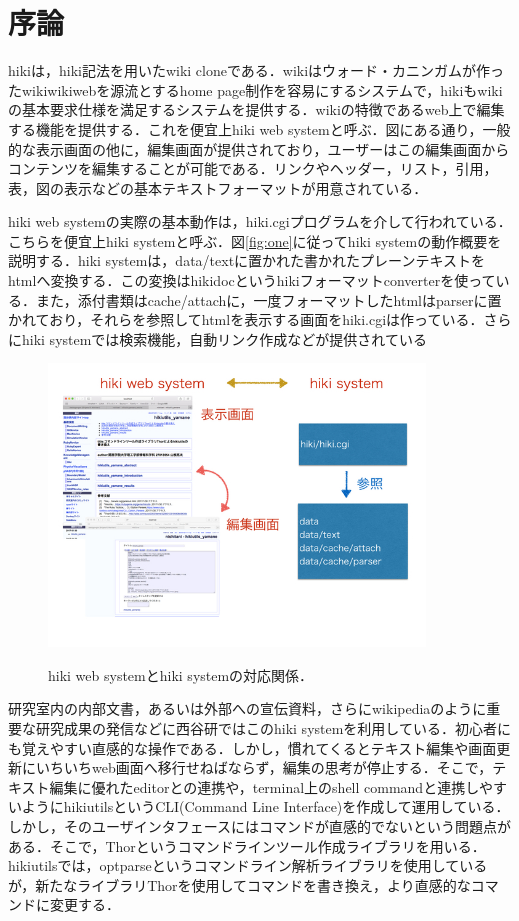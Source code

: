 \section{序論}
hikiは，hiki記法を用いたwiki cloneである．wikiはウォード・カニンガムが作ったwikiwikiwebを源流とするhome page制作を容易にするシステムで，hikiもwikiの基本要求仕様を満足するシステムを提供する．wikiの特徴であるweb上で編集する機能を提供する．これを便宜上hiki web systemと呼ぶ．図にある通り，一般的な表示画面の他に，編集画面が提供されており，ユーザーはこの編集画面からコンテンツを編集することが可能である．リンクやヘッダー，リスト，引用，表，図の表示などの基本テキストフォーマットが用意されている．

hiki web systemの実際の基本動作は，hiki.cgiプログラムを介して行われている．こちらを便宜上hiki systemと呼ぶ．図\ref{fig:one}に従ってhiki systemの動作概要を説明する．hiki systemは，data/textに置かれた書かれたプレーンテキストをhtmlへ変換する．この変換はhikidoc\cite{1-1}というhikiフォーマットconverterを使っている．また，添付書類はcache/attachに，一度フォーマットしたhtmlはparserに置かれており，それらを参照してhtmlを表示する画面をhiki.cgiは作っている．さらにhiki systemでは検索機能，自動リンク作成などが提供されている

\begin{figure}[htbp]\begin{center}
\includegraphics[width=10cm,bb= 0 0 737 553]{../figs/./hikiutils_yamane.001.jpg}
\caption{hiki web systemとhiki systemの対応関係．}
\label{fig:one}
\label{default}\end{center}\end{figure}
研究室内の内部文書，あるいは外部への宣伝資料，さらにwikipediaのように重要な研究成果の発信などに西谷研ではこのhiki systemを利用している．初心者にも覚えやすい直感的な操作である．しかし，慣れてくるとテキスト編集や画面更新にいちいちweb画面へ移行せねばならず，編集の思考が停止する．そこで，テキスト編集に優れたeditorとの連携や，terminal上のshell commandと連携しやすいようにhikiutilsというCLI(Command Line Interface)を作成して運用している．しかし，そのユーザインタフェースにはコマンドが直感的でないという問題点がある．そこで，Thorというコマンドラインツール作成ライブラリを用いる．hikiutilsでは，optparseというコマンドライン解析ライブラリを使用しているが，新たなライブラリThorを使用してコマンドを書き換え，より直感的なコマンドに変更する．

